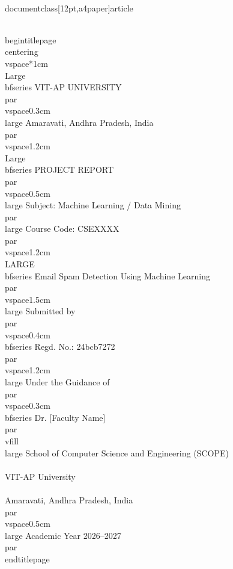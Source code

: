 \\documentclass[12pt,a4paper]{article}
\begin{document}
\\begin{titlepage}
\\centering
\\vspace*{1cm}
{\\Large\\bfseries VIT-AP UNIVERSITY\\par}
\\vspace{0.3cm}
{\\large Amaravati, Andhra Pradesh, India\\par}
\\vspace{1.2cm}
{\\Large\\bfseries PROJECT REPORT\\par}
\\vspace{0.5cm}
{\\large Subject: Machine Learning / Data Mining\\par}
{\\large Course Code: CSEXXXX\\par}
\\vspace{1.2cm}
{\\LARGE\\bfseries Email Spam Detection Using Machine Learning\\par}
\\vspace{1.5cm}
{\\large Submitted by\\par}
\\vspace{0.4cm}
{\\bfseries Regd. No.: 24bcb7272\\par}
\\vspace{1.2cm}
{\\large Under the Guidance of\\par}
\\vspace{0.3cm}
{\\bfseries Dr. [Faculty Name]\\par}
\\vfill
{\\large School of Computer Science and Engineering (SCOPE)\\\\ VIT-AP University\\\\ Amaravati, Andhra Pradesh, India\\par}
\\vspace{0.5cm}
{\\large Academic Year 2026--2027\\par}
\\end{titlepage}
\end{document}
